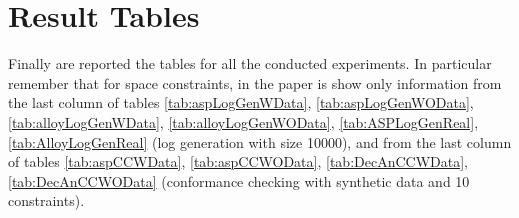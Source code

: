 \section{Result Tables}
Finally are reported the tables for all the conducted experiments. In particular remember that for space constraints, in the paper is show only  information from the last column of tables \ref{tab:aspLogGenWData}, \ref{tab:aspLogGenWOData}, \ref{tab:alloyLogGenWData}, \ref{tab:alloyLogGenWOData}, \ref{tab:ASPLogGenReal}, \ref{tab:AlloyLogGenReal} (log generation with size 10000), and from the last column of tables \ref{tab:aspCCWData}, \ref{tab:aspCCWOData}, \ref{tab:DecAnCCWData}, \ref{tab:DecAnCCWOData} (conformance checking with synthetic data and 10 constraints).


\begin{table}[]
\caption{ASP Log generation, with data}
\label{tab:aspLogGenWData}
\end{table}
